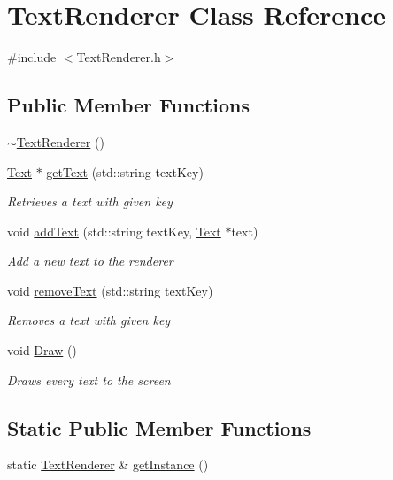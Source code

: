 \hypertarget{class_text_renderer}{}\section{Text\+Renderer Class Reference}
\label{class_text_renderer}


{\ttfamily \#include $<$Text\+Renderer.\+h$>$}

\subsection*{Public Member Functions}
\begin{DoxyCompactItemize}
\item 
\mbox{\hyperlink{class_text_renderer_a7087505bdc31e41416408c27fe029f20}{$\sim$\+Text\+Renderer}} ()
\item 
\mbox{\hyperlink{class_text}{Text}} $\ast$ \mbox{\hyperlink{class_text_renderer_ac05aa714426b16276c45647e8c7c50bd}{get\+Text}} (std\+::string text\+Key)
\begin{DoxyCompactList}\small\item\em Retrieves a text with given key \end{DoxyCompactList}\item 
void \mbox{\hyperlink{class_text_renderer_af174d80bebf4e0eb8a9039bc7466893e}{add\+Text}} (std\+::string text\+Key, \mbox{\hyperlink{class_text}{Text}} $\ast$text)
\begin{DoxyCompactList}\small\item\em Add a new text to the renderer \end{DoxyCompactList}\item 
void \mbox{\hyperlink{class_text_renderer_a7bbce1218d00986c91ff15e5e6dfdc3a}{remove\+Text}} (std\+::string text\+Key)
\begin{DoxyCompactList}\small\item\em Removes a text with given key \end{DoxyCompactList}\item 
void \mbox{\hyperlink{class_text_renderer_a58d44a6db6f6410a6ec292b811f774a2}{Draw}} ()
\begin{DoxyCompactList}\small\item\em Draws every text to the screen \end{DoxyCompactList}\end{DoxyCompactItemize}
\subsection*{Static Public Member Functions}
\begin{DoxyCompactItemize}
\item 
static \mbox{\hyperlink{class_text_renderer}{Text\+Renderer}} \& \mbox{\hyperlink{class_text_renderer_a94a68e46e699ba95ae64ad7bf6f8a1be}{get\+Instance}} ()
\end{DoxyCompactItemize}


